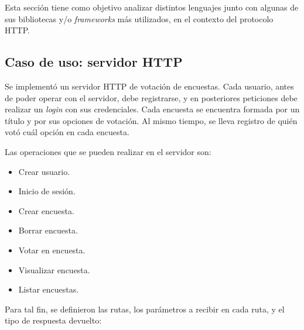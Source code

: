 \documentclass[11pt]{article}
\let\Oldsubsection\subsection
\renewcommand{\subsection}{\FloatBarrier\Oldsubsection}
\newcommand{\english}[1]{\textit{#1}}
\begin{document}
Esta sección tiene como objetivo analizar distintos lenguajes junto con algunas de sus bibliotecas y/o \english{frameworks} más utilizados, en el contexto del protocolo HTTP.

\subsection{Caso de uso: servidor HTTP}

Se implementó un servidor HTTP de votación de encuestas. Cada usuario, antes de poder operar con el servidor, debe registrarse, y en posteriores peticiones debe realizar un \english{login} con sus credenciales. Cada encuesta se encuentra formada por un título y por sus opciones de votación. Al mismo tiempo, se lleva registro de quién votó cuál opción en cada encuesta.

Las operaciones que se pueden realizar en el servidor son:

\begin{itemize}
    \item Crear usuario.
    \item Inicio de sesión.
    \item Crear encuesta.
    \item Borrar encuesta.
    \item Votar en encuesta.
    \item Visualizar encuesta.
    \item Listar encuestas.
\end{itemize}

Para tal fin, se definieron las rutas, los parámetros a recibir en cada ruta, y el tipo de respuesta devuelto:
\end{document}
